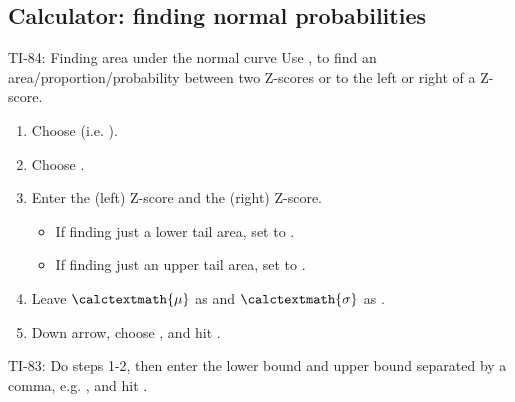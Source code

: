 \D{\newpage}

\subsection{Calculator: finding normal probabilities}
\label{normal}

\begin{onebox}{ TI-84: Finding area under the normal curve}
Use  ,  to find an area/proportion/probability between two Z-scores or to the left or right of a Z-score.\vspace{-1mm}
\begin{enumerate}
\setlength{\itemsep}{0mm}
\item Choose   (i.e. ).
\item Choose .
\item Enter the  (left) Z-score and the  (right) Z-score.
\vspace{-1.5mm}
  \begin{itemize}
  \setlength{\itemsep}{0mm}
  \item If finding just a lower tail area, set  to .
  \item If finding just an upper tail area, set  to .
\end{itemize}
\item Leave $\calctextmath{\mu}$ as  and $\calctextmath{\sigma}$ as .
\item Down arrow, choose , and hit .\vspace{-1.5mm}
\end{enumerate}
TI-83: Do steps 1-2, then enter the lower bound and upper bound separated by a comma, e.g. , and hit .\end{onebox}

